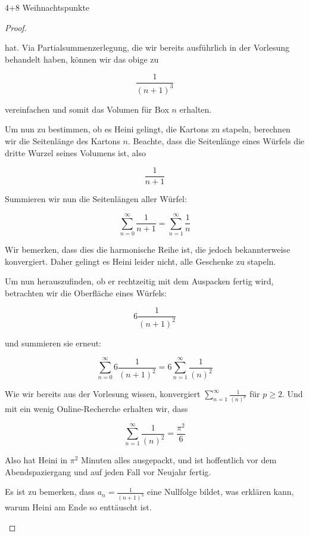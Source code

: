 \documentclass{problemset}
\begin{document}
\begin{problem}[Weihnachtsaufgaben*]{4+8 Weihnachtspunkte}
\begin{proof}
\begin{enumerate}
              hat. Via Partialsummenzerlegung, die wir bereits ausführlich in
              der Vorlesung behandelt haben, können wir das obige zu

              \[
                  \frac{1}{{(n+1)}^3}
              \]

              vereinfachen und somit das Volumen für Box $n$ erhalten.

              Um nun zu bestimmen, ob es Heini gelingt, die Kartons zu stapeln,
              berechnen wir die Seitenlänge des Kartons $n$. Beachte, dass die
              Seitenlänge eines Würfels die dritte Wurzel seines Volumens ist,
              also

              \[
                  \frac{1}{n+1}
              \]

              Summieren wir nun die Seitenlängen aller Würfel:

              \[
                  \sum_{n=0}^{\infty} \frac{1}{n+1} = \sum_{n=1}^{\infty} \frac{1}{n}
              \]

              Wir bemerken, dass dies die harmonische Reihe ist, die jedoch
              bekannterweise konvergiert. Daher gelingt es Heini leider nicht,
              alle Geschenke zu stapeln.

              Um nun herauszufinden, ob er rechtzeitig mit dem Auspacken fertig
              wird, betrachten wir die Oberfläche eines Würfels:

              \[
                  6 \frac{1}{{(n+1)}^2}
              \]

              und summieren sie erneut:

              \[
                  \sum_{n=0}^{\infty} 6 \frac{1}{{(n+1)}^2} = 6 \sum_{n=1}^{\infty} \frac{1}{{(n)}^2}
              \]

              Wie wir bereits aus der Vorlesung wissen, konvergiert
              $\sum_{n=1}^{\infty} \frac{1}{{(n)}^p}$ für $p \ge 2$. Und mit
              ein wenig Online-Recherche erhalten wir, dass

              \[
                  \sum_{n=1}^{\infty} \frac{1}{{(n)}^2} = \frac{\pi^2}{6}
              \]

              Also hat Heini in $\pi^2$ Minuten alles ausgepackt, und ist
              hoffentlich vor dem Abendspaziergang und auf jeden Fall vor
              Neujahr fertig.

              Es ist zu bemerken, dass $a_n = \frac{1}{{(n+1)}^3}$ eine
              Nullfolge bildet, was erklären kann, warum Heini am Ende so
              enttäuscht ist.

    \end{enumerate}

\end{proof}
\end{problem}
\end{document}
